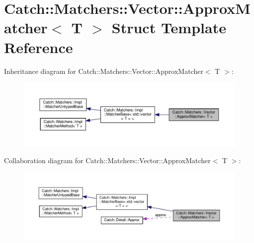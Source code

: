 \hypertarget{structCatch_1_1Matchers_1_1Vector_1_1ApproxMatcher}{}\section{Catch\+:\+:Matchers\+:\+:Vector\+:\+:Approx\+Matcher$<$ T $>$ Struct Template Reference}
\label{structCatch_1_1Matchers_1_1Vector_1_1ApproxMatcher}


Inheritance diagram for Catch\+:\+:Matchers\+:\+:Vector\+:\+:Approx\+Matcher$<$ T $>$\+:
\nopagebreak
\begin{figure}[H]
\begin{center}
\leavevmode
\includegraphics[width=350pt]{structCatch_1_1Matchers_1_1Vector_1_1ApproxMatcher__inherit__graph}
\end{center}
\end{figure}


Collaboration diagram for Catch\+:\+:Matchers\+:\+:Vector\+:\+:Approx\+Matcher$<$ T $>$\+:
\nopagebreak
\begin{figure}[H]
\begin{center}
\leavevmode
\includegraphics[width=350pt]{structCatch_1_1Matchers_1_1Vector_1_1ApproxMatcher__coll__graph}
\end{center}
\end{figure}

